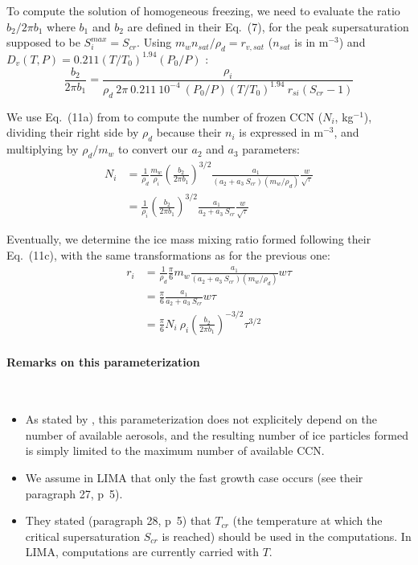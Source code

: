 To compute the solution of homogeneous freezing, we need to evaluate the ratio $b_2 /2 \pi b_1$ where $b_1$ and $b_2$ are defined in their Eq.\ (7), for the peak supersaturation supposed to be $S_i^{max}=S_{cr}$. Using $m_w n_{sat} / \rho_d = r_{v,sat}$ ($n_{sat}$ is in m$^{-3}$) and $D_v(T,P) = 0.211 (T/T_0)^{1.94} (P_0/P)$ \citep[Eq.\ (13-3) from][with $D_v$ expressed in cm$^2$~s$^{-1}$]{Pruppacher1997}:
\begin{equation}
 \frac{b_2}{2 \pi b_1} = \frac{\rho_i}{\rho_d ~ 2 \pi~0.211~10^{-4} ~ (P_0/P) (T/T_0)^{1.94} ~ r_{si} (S_{cr}-1)}
\end{equation}

We use Eq.\ (11a) from \citet{Karcher2002} to compute the number of frozen CCN ($N_i$, kg$^{-1}$), dividing their right side by $\rho_d$ because their $n_i$ is expressed in m$^{-3}$, and multiplying by $\rho_d / m_w$ to convert our $a_2$ and $a_3$ parameters:
\begin{align}
 N_i &= \frac{1}{\rho_d} \frac{m_w}{\rho_i} \left( \frac{b_2}{2 \pi b_1} \right)^{3/2} \frac{a_1}{(a_2 + a_3 ~ S_{cr})(m_w/\rho_d)} \frac{w}{\sqrt{\tau}} \\
 &= \frac{1}{\rho_i} \left( \frac{b_2}{2 \pi b_1} \right)^{3/2} \frac{a_1}{a_2 + a_3 ~ S_{cr}} \frac{w}{\sqrt{\tau}}
\end{align}

Eventually, we determine the ice mass mixing ratio formed following their Eq.\ (11c), with the same transformations as for the previous one:
\begin{align}
 r_i &= \frac{1}{\rho_d} \frac{\pi}{6} m_w \frac{a_1}{(a_2 + a_3 ~ S_{cr})(m_w/\rho_d)} w \tau \\
 &= \frac{\pi}{6} \frac{a_1}{a_2 + a_3 ~ S_{cr}} w \tau \\
 &= \frac{\pi}{6} N_i~\rho_i \left(\frac{b_2}{2 \pi b_1}\right)^{-3/2} \tau^{3/2} 
\end{align}

\paragraph{Remarks on this parameterization}
~\\
\begin{itemize}
 \item As stated by \citet{Karcher2002}, this parameterization does not explicitely depend on the number of available aerosols, and the resulting number of ice particles formed is simply limited to the maximum number of available CCN.
 \item We assume in LIMA that only the fast growth case occurs (see their paragraph 27, p~5).
 \item They stated (paragraph 28, p~5) that $T_{cr}$ (the temperature at which the critical supersaturation $S_{cr}$ is reached) should be used in the computations. In LIMA, computations are currently carried with $T$.
\end{itemize}

